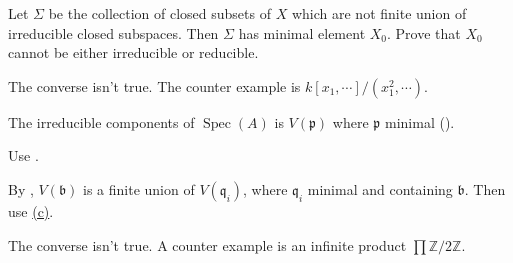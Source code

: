 \begin{exercise}\label{ex6.7}
	Let $\Sigma$ be the collection of closed subsets of $X$ which are not finite union of irreducible closed subspaces. Then $\Sigma$ has minimal element $X_0$. Prove that $X_0$ cannot be either irreducible or reducible.
\end{exercise}

\begin{exercise}\label{ex6.8}
	The converse isn't true. The counter example is $k[x_1,\cdots]/\left(x_1^2,\cdots\right)$.
\end{exercise}

\begin{exercise}\label{ex6.9}
	The irreducible components of $\operatorname{Spec}(A)$ is $V(\mathfrak{p})$ where $\mathfrak{p}$ minimal ().
\end{exercise}

\begin{exercise}\label{ex6.10}
	Use .
\end{exercise}

\begin{exercise}\label{ex6.11}
	By , $V(\mathfrak{b})$ is a finite union of $V(\mathfrak{q}_i)$, where $\mathfrak{q}_i$ minimal and containing $\mathfrak{b}$. Then use \hyperref[ex5.10]{(c)}.
\end{exercise}

\begin{exercise}\label{ex6.12}
	The converse isn't true. A counter example is an infinite product $\prod\mathbb{Z}/2\mathbb{Z}$.
\end{exercise}